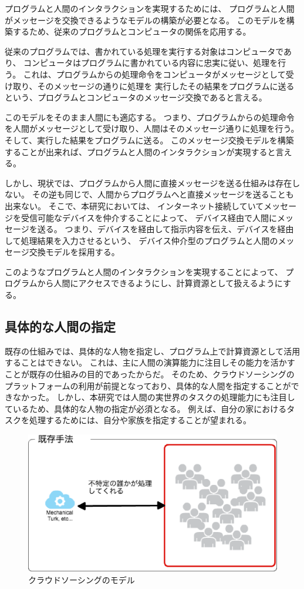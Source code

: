 プログラムと人間のインタラクションを実現するためには、
プログラムと人間がメッセージを交換できるようなモデルの構築が必要となる。
このモデルを構築するため、従来のプログラムとコンピュータの関係を応用する。

従来のプログラムでは、書かれている処理を実行する対象はコンピュータであり、
コンピュータはプログラムに書かれている内容に忠実に従い、処理を行う。
これは、プログラムからの処理命令をコンピュータがメッセージとして受け取り、そのメッセージの通りに処理を
実行したその結果をプログラムに送るという、プログラムとコンピュータのメッセージ交換であると言える。

このモデルをそのまま人間にも適応する。
つまり、プログラムからの処理命令を人間がメッセージとして受け取り、人間はそのメッセージ通りに処理を行う。
そして、実行した結果をプログラムに送る。
このメッセージ交換モデルを構築することが出来れば、プログラムと人間のインタラクションが実現すると言える。

しかし、現状では、プログラムから人間に直接メッセージを送る仕組みは存在しない。
その逆も同じで、人間からプログラムへと直接メッセージを送ることも出来ない。
そこで、本研究においては、
インターネット接続していてメッセージを受信可能なデバイスを仲介することによって、
デバイス経由で人間にメッセージを送る。
つまり、デバイスを経由して指示内容を伝え、デバイスを経由して処理結果を入力させるという、
デバイス仲介型のプログラムと人間のメッセージ交換モデルを採用する。

このようなプログラムと人間のインタラクションを実現することによって、
プログラムから人間にアクセスできるようにし、計算資源として扱えるようにする。

\subsection{具体的な人間の指定}\label{ux5177ux4f53ux7684ux306aux4ebaux9593ux306eux6307ux5b9a}

既存の仕組みでは、具体的な人物を指定し、プログラム上で計算資源として活用することはできない。
これは、主に人間の演算能力に注目しその能力を活かすことが既存の仕組みの目的であったからだ。
そのため、クラウドソーシングのプラットフォームの利用が前提となっており、具体的な人間を指定することができなかった。
しかし、本研究では人間の実世界のタスクの処理能力にも注目しているため、具体的な人物の指定が必須となる。
例えば、自分の家におけるタスクを処理するためには、自分や家族を指定することが望まれる。

\begin{figure}[htbp]
  \begin{center}
  \includegraphics[width=.5\linewidth]{images/crowdsourcing_model.eps}
  \end{center}
  \caption{クラウドソーシングのモデル}
  \label{fig:crowdsourcing_model}
\end{figure}

